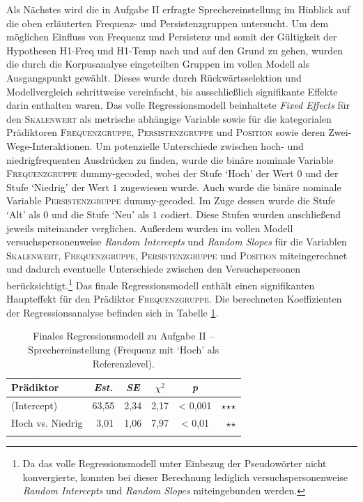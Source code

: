 Als Nächstes wird die in Aufgabe II erfragte Sprechereinstellung im Hinblick auf die oben erläuterten Frequenz- und Persistenzgruppen untersucht. Um dem möglichen Einfluss von Frequenz und Persistenz und somit der Gültigkeit der Hypothesen H1-Freq und H1-Temp nach {\citet[2]{Hauschild.1899}} und \citet[59]{Tobler.1868} auf den Grund zu gehen, wurden die durch die Korpusanalyse eingeteilten Gruppen im vollen Modell als Ausgangspunkt gewählt. Dieses wurde durch Rückwärtsselektion und Modellvergleich schrittweise vereinfacht, bis ausschließlich signifikante Effekte darin enthalten waren. Das volle Regressionsmodell beinhaltete \textit{Fixed Effects} für den \textsc{Skalenwert} als metrische abhängige Variable sowie für die kategorialen Prädiktoren \textsc{Frequenzgruppe}, \textsc{Persistenzgruppe} und \textsc{Position} sowie deren Zwei-Wege-Interaktionen. Um potenzielle Unterschiede zwischen hoch- und niedrigfrequenten Ausdrücken zu finden, wurde die binäre nominale Variable \textsc{Frequenzgruppe} dummy-gecoded, wobei der Stufe `Hoch' der {Wert $0$} und der Stufe `Niedrig' der Wert $1$ zugewiesen wurde. Auch wurde die binäre nominale Variable \textsc{Persistenzgruppe} dummy-gecoded. Im Zuge dessen wurde die Stufe `Alt' als $0$ und die Stufe `Neu' als $1$ codiert. Diese Stufen wurden anschließend jeweils miteinander verglichen. Außerdem wurden im vollen Modell versuchspersonenweise \textit{Random Intercepts} und \textit{Random Slopes} für die Variablen  \textsc{Skalenwert}, \textsc{Frequenzgruppe}, \textsc{Persistenzgruppe} und \textsc{Position} miteingerechnet und dadurch eventuelle Unterschiede zwischen den Versuchspersonen berücksichtigt.\footnote{Da das volle Regressionsmodell unter Einbezug der Pseudowörter nicht konvergierte, konnten bei dieser Berechnung lediglich versuchspersonenweise \textit{Random Intercepts} und \textit{Random Slopes} miteingebunden werden.} Das finale Regressionsmodell enthält einen signifikanten Haupteffekt für den Prädiktor \textsc{Frequenzgruppe}. Die berechneten Koeffizienten der Regressionsanalyse befinden sich in {Tabelle \ref{LinRegzaz0}}.

%
\begin{table}
\begin{tabularx}{.8\textwidth}{Xccccr}
\lsptoprule
Prädiktor & \textit{Est.} & \textit{SE} & \textit{$\chi$$^{2}$} & \textit{p} & \\
\midrule
(Intercept) & 63,55 & 2,34 & 2,17 & < 0,001 & $\star$$\star$$\star$\\
Hoch vs. Niedrig & \textcolor{white}{-}3,01 & 1,06 & 7,97 & < 0,01 & \multicolumn{1}{r}{$\star$$\star$} \\
\lspbottomrule
\end{tabularx}
\caption[Finales Regressionsmodell zu Aufgabe II von Experiment 1 (Frequenz mit `Hoch' als Referenzlevel)]{Finales Regressionsmodell zu Aufgabe II -- Sprechereinstellung (Frequenz mit `Hoch' als Referenzlevel).}
\label{LinRegzaz0}
\end{table}

